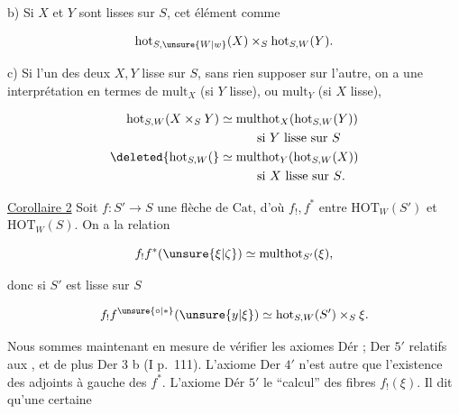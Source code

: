 
b) Si $X$ et $Y$ sont lisses sur $S$, cet élément  comme

\[
 \mathrm{hot}_{S,\unsure{W|w}}(X)\times_S\mathrm{hot}_{S,W}(Y).
\]


c) Si l'un des deux $X,Y$  lisse sur $S$, sans rien supposer sur l'autre, on a une interprétation en termes de $\mathrm{mult}_X$ (si $Y$ lisse), ou $\mathrm{mult}_Y$ (si $X$ lisse), 

\[
\begin{aligned}
 \mathrm{hot}_{S,W}(X\times_S Y)&\simeq\mathrm{multhot}_X(\mathrm{hot}_{S,W}(Y))\\
 &\hspace{3em}\text{si $Y$ lisse sur $S$}\\
 \deleted{\mathrm{hot}_{S,W}(}&\simeq\mathrm{multhot}_Y(\mathrm{hot}_{S,W}(X))\\
 &\hspace{3em}\text{si $X$ lisse sur $S$.}
\end{aligned}
\]

\uline{Corollaire 2} Soit $f:S'\longrightarrow S$ une flèche de $\mathrm{Cat}$, d'où $f_!,f^*$ \deleted{\unsure{;}} entre $\mathrm{HOT}_W(S')$ et $\mathrm{HOT}_W(S)$. On a la relation

\[
 f_!f^*(\unsure{\xi|\zeta})\simeq\mathrm{multhot}_{S'}(\xi),
\]

donc si $S'$ est lisse sur $S$

\[
 f_!f^{\unsure{\circ|*}}(\unsure{y|\xi})\simeq\mathrm{hot}_{S,W}(S')\times_S\xi.
\]

Nous sommes maintenant en mesure de vérifier les axiomes Dér  ; Der $5'$ relatifs aux  ,  et de plus Der 3 b (I p.~111). L'axiome Der $4'$ n'est autre que l'existence des adjoints à gauche  des $f^*$. L'axiome Dér $5'$  le ``calcul'' des fibres  $f_!(\xi)$. Il dit qu'une certaine


